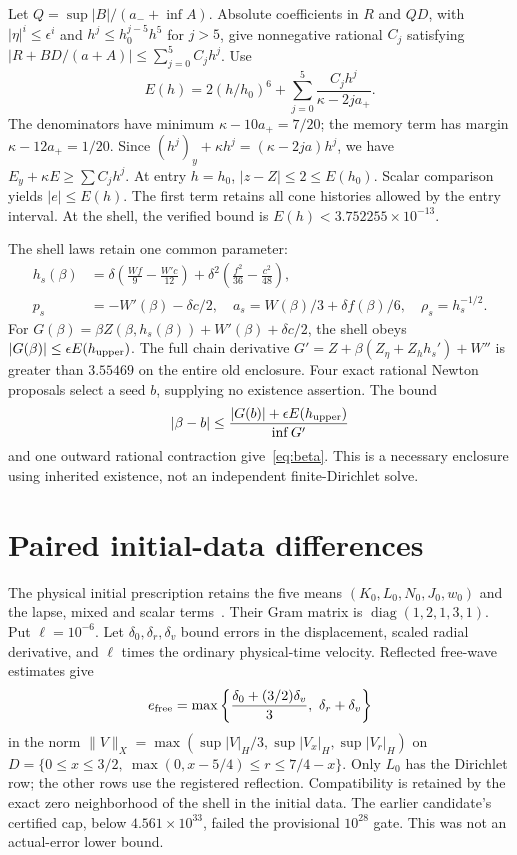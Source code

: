 \documentclass[11pt]{article}
\begin{document}
Let $Q=\sup|B|/(a_-+\inf A)$. Absolute coefficients in $R$ and $QD$, with
$|\eta|^i\leq\epsilon^i$ and $h^j\leq h_0^{j-5}h^5$ for $j>5$, give
nonnegative rational $C_j$ satisfying
$|R+BD/(a+A)|\leq\sum_{j=0}^5 C_jh^j$. Use
\begin{equation}
 E(h)=2(h/h_0)^6+\sum_{j=0}^5\frac{C_jh^j}{\kappa-2ja_+}.\label{eq:barrier}
\end{equation}
The denominators have minimum $\kappa-10a_+=7/20$; the memory term has
margin $\kappa-12a_+=1/20$. Since
$(h^j)_y+\kappa h^j=(\kappa-2ja)h^j$, we have
$E_y+\kappa E\geq\sum C_jh^j$. At entry $h=h_0$,
$|z-Z|\leq2\leq E(h_0)$. Scalar comparison yields $|e|\leq E(h)$.
The first term retains all cone histories allowed by the entry interval.
At the shell, the verified bound is $E(h)<3.752255\times10^{-13}$.

The shell laws retain one common parameter:
\begin{align}
 h_s(\beta)&=\delta\left(\frac{Wf}{9}-\frac{W'c}{12}\right)
              +\delta^2\left(\frac{f^2}{36}-\frac{c^2}{48}\right),\label{eq:shell}\\
 p_s&=-W'(\beta)-\delta c/2,\quad
 a_s=W(\beta)/3+\delta f(\beta)/6,\quad \rho_s=h_s^{-1/2}.\nonumber
\end{align}
For $G(\beta)=\beta Z(\beta,h_s(\beta))+W'(\beta)+\delta c/2$,
the shell obeys $|G(\beta)|\leq\epsilon E(h_{\rm upper})$.
The full chain derivative $G'=Z+\beta(Z_\eta+Z_hh_s')+W''$ is greater
than $3.55469$ on the entire old enclosure. Four exact rational Newton
proposals select a seed $b$, supplying no existence assertion. The bound
\[
 |\beta-b|\leq\frac{|G(b)|+\epsilon E(h_{\rm upper})}{\inf G'}
\]
and one outward rational contraction give~\eqref{eq:beta}. This is a necessary
enclosure using inherited existence, not an independent finite-Dirichlet solve.

\section{Paired initial-data differences}
The physical initial prescription retains the five means
$(K_0,L_0,N_0,J_0,w_0)$ and the lapse, mixed and scalar
terms~\cite{initial}. Their Gram matrix is $\operatorname{diag}(1,2,1,3,1)$. Put $\ell=10^{-6}$. Let $\delta_0,\delta_r,\delta_v$
bound errors in the displacement, scaled radial derivative, and $\ell$ times
the ordinary physical-time velocity. Reflected free-wave estimates give
\begin{equation}
 e_{\rm free}=\max\left\{
       \frac{\delta_0+(3/2)\delta_v}{3},\ \delta_r+\delta_v\right\}
 \label{eq:free}
\end{equation}
in the norm
$\|V\|_X=\max(\sup|V|_H/3,\sup|V_x|_H,\sup|V_r|_H)$ on
$D=\{0\leq x\leq3/2,\ \max(0,x-5/4)\leq r\leq7/4-x\}$.
Only $L_0$ has the Dirichlet row; the other rows use the registered
reflection. Compatibility is retained by the exact zero neighborhood of the
shell in the initial data.
The earlier candidate's certified cap, below $4.561\times10^{33}$, failed
the provisional $10^{28}$ gate. This was not an actual-error lower bound.
\end{document}
